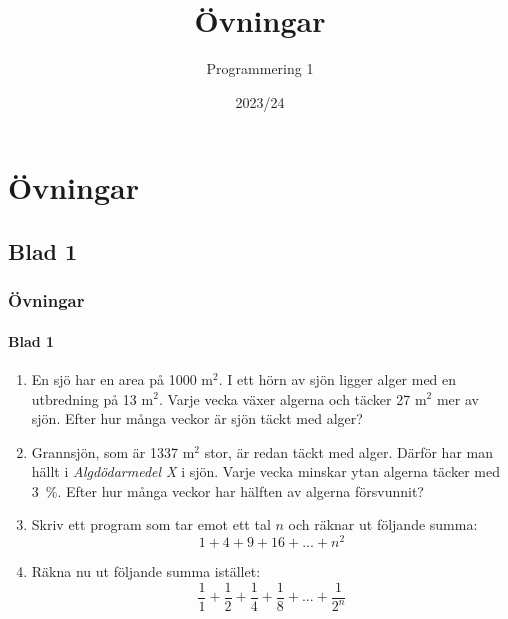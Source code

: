 \documentclass[aspectratio=169]{beamer}
\begin{document}

\title{Övningar}
\date{2023/24}
\author{Programmering 1}

\maketitle

\section{Övningar}

\subsection{Blad 1}

\begin{frame}
	\frametitle{Övningar}
	\framesubtitle{Blad 1}
	
	\begin{enumerate}
		 \item En sjö har en area på 1000 m$^2$. I ett hörn av sjön ligger alger med en utbredning på 13 m$^2$. Varje vecka växer algerna och täcker 27 m$^2$ mer av sjön. Efter hur många veckor är sjön täckt med alger?
		 \item Grannsjön, som är 1337 m$^2$ stor, är redan täckt med alger. Därför har man hällt i \textit{Algdödarmedel X} i sjön. Varje vecka minskar ytan algerna täcker med 3~\%. Efter hur många veckor har hälften av algerna försvunnit?
		 \item Skriv ett program som tar emot ett tal \(n\) och räknar ut följande summa: \[1+4+9+16+...+n^2\]
		 \item Räkna nu ut följande summa istället: \[\dfrac{1}{1}+\dfrac{1}{2}+\dfrac{1}{4}+\dfrac{1}{8}+...+\dfrac{1}{2^n}\]
	\end{enumerate}

\end{frame}
\end{document}
